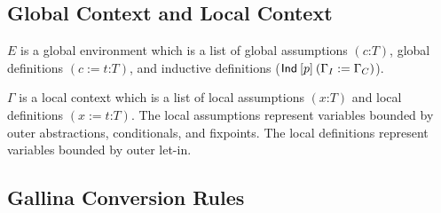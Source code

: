 \documentclass[a4paper,fleqn]{article}
\def\gallina{\textrm{Gallina}}
\newcommand{\kwmatch}{\mbox{\color{mygreen}\ttfamily match}}
\newcommand{\gassum}[2]{(#1\mathord{:}#2)}
\newcommand{\glodef}[3]{(#1:=#2\mathord{:}#3)}
\newcommand{\lassum}[2]{(#1\mathord{:}#2)}
\newcommand{\ldef}[3]{(#1:=#2\mathord{:}#3)}
\begin{document}

\subsection{Global Context and Local Context}

$E$ is a global environment which is a list of
global assumptions $\gassum{c}{T}$,
global definitions $\glodef{c}{t}{T}$, and
inductive definitions ($\text{\sf Ind}\:[p]\:(\Gamma_I := \Gamma_C)$).

$\Gamma$ is a local context which is a list of
local assumptions $\lassum{x}{T}$ and
local definitions $\ldef{x}{t}{T}$.
The local assumptions represent variables bounded by outer abstractions, conditionals, and fixpoints.
The local definitions represent variables bounded by outer let-in.

\subsection{\gallina{} Conversion Rules}\label{sec:conversion-rules}
\end{document}
